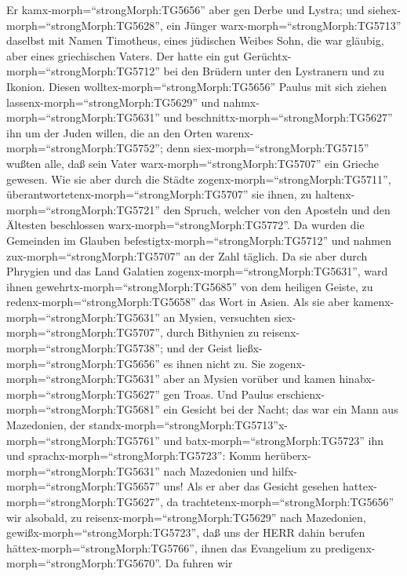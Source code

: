  Er kamx-morph=``strongMorph:TG5656'' aber gen Derbe und
Lystra; und siehex-morph=``strongMorph:TG5628'', ein Jünger
warx-morph=``strongMorph:TG5713'' daselbst mit Namen Timotheus, eines
jüdischen Weibes Sohn, die war gläubig, aber eines griechischen Vaters.
 Der hatte ein gut Gerüchtx-morph=``strongMorph:TG5712'' bei
den Brüdern unter den Lystranern und zu Ikonion.  Diesen
wolltex-morph=``strongMorph:TG5656'' Paulus mit sich ziehen
lassenx-morph=``strongMorph:TG5629'' und
nahmx-morph=``strongMorph:TG5631'' und
beschnittx-morph=``strongMorph:TG5627'' ihn um der Juden willen, die an
den Orten warenx-morph=``strongMorph:TG5752''; denn
siex-morph=``strongMorph:TG5715'' wußten alle, daß sein Vater
warx-morph=``strongMorph:TG5707'' ein Grieche gewesen.  Wie
sie aber durch die Städte zogenx-morph=``strongMorph:TG5711'',
überantwortetenx-morph=``strongMorph:TG5707'' sie ihnen, zu
haltenx-morph=``strongMorph:TG5721'' den Spruch, welcher von den
Aposteln und den Ältesten beschlossen warx-morph=``strongMorph:TG5772''.
 Da wurden die Gemeinden im Glauben
befestigtx-morph=``strongMorph:TG5712'' und nahmen
zux-morph=``strongMorph:TG5707'' an der Zahl täglich.  Da
sie aber durch Phrygien und das Land Galatien
zogenx-morph=``strongMorph:TG5631'', ward ihnen
gewehrtx-morph=``strongMorph:TG5685'' von dem heiligen Geiste, zu
redenx-morph=``strongMorph:TG5658'' das Wort in Asien.  Als
sie aber kamenx-morph=``strongMorph:TG5631'' an Mysien, versuchten
siex-morph=``strongMorph:TG5707'', durch Bithynien zu
reisenx-morph=``strongMorph:TG5738''; und der Geist
ließx-morph=``strongMorph:TG5656'' es ihnen nicht zu.  Sie
zogenx-morph=``strongMorph:TG5631'' aber an Mysien vorüber und kamen
hinabx-morph=``strongMorph:TG5627'' gen Troas.  Und Paulus
erschienx-morph=``strongMorph:TG5681'' ein Gesicht bei der Nacht; das
war ein Mann aus Mazedonien, der
standx-morph=``strongMorph:TG5713''x-morph=``strongMorph:TG5761'' und
batx-morph=``strongMorph:TG5723'' ihn und
sprachx-morph=``strongMorph:TG5723'': Komm
herüberx-morph=``strongMorph:TG5631'' nach Mazedonien und
hilfx-morph=``strongMorph:TG5657'' uns!  Als er aber das
Gesicht gesehen hattex-morph=``strongMorph:TG5627'', da
trachtetenx-morph=``strongMorph:TG5656'' wir alsobald, zu
reisenx-morph=``strongMorph:TG5629'' nach Mazedonien,
gewißx-morph=``strongMorph:TG5723'', daß uns der HERR dahin berufen
hättex-morph=``strongMorph:TG5766'', ihnen das Evangelium zu
predigenx-morph=``strongMorph:TG5670''.  Da fuhren wir
